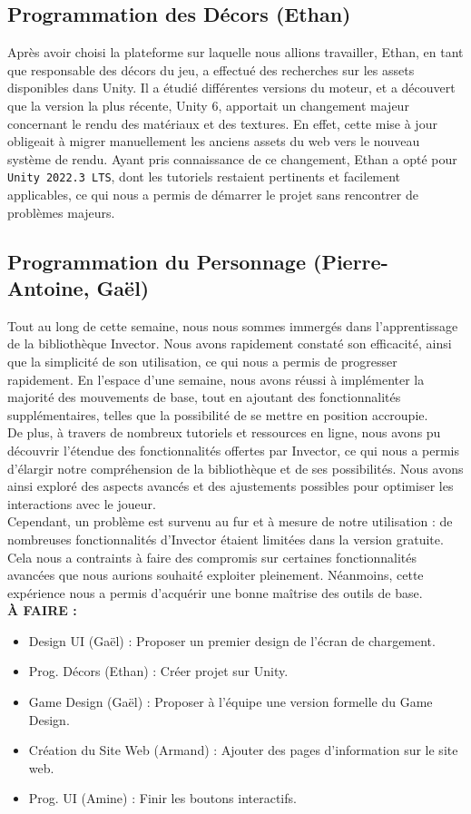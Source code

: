 \documentclass{report}
\begin{document}
\subsection*{Programmation des Décors (Ethan)}
Après avoir choisi la plateforme sur laquelle nous allions travailler, Ethan, en tant que responsable des décors du jeu, a effectué des recherches sur les assets disponibles dans Unity. Il a étudié différentes versions du moteur, et a découvert que la version la plus récente, Unity 6, apportait un changement majeur concernant le rendu des matériaux et des textures. En effet, cette mise à jour obligeait à migrer manuellement les anciens assets du web vers le nouveau système de rendu. Ayant pris connaissance de ce changement, Ethan a opté pour \texttt{Unity 2022.3 LTS}, dont les tutoriels restaient pertinents et facilement applicables, ce qui nous a permis de démarrer le projet sans rencontrer de problèmes majeurs.

\subsection*{Programmation du Personnage (Pierre-Antoine, Gaël)}
Tout au long de cette semaine, nous nous sommes immergés dans l’apprentissage de la bibliothèque Invector. Nous avons rapidement constaté son efficacité, ainsi que la simplicité de son utilisation, ce qui nous a permis de progresser rapidement. En l’espace d’une semaine, nous avons réussi à implémenter la majorité des mouvements de base, tout en ajoutant des fonctionnalités supplémentaires, telles que la possibilité de se mettre en position accroupie.
\\[0.4cm]
De plus, à travers de nombreux tutoriels et ressources en ligne, nous avons pu découvrir l’étendue des fonctionnalités offertes par Invector, ce qui nous a permis d’élargir notre compréhension de la bibliothèque et de ses possibilités. Nous avons ainsi exploré des aspects avancés et des ajustements possibles pour optimiser les interactions avec le joueur.
\\[0.4cm]
Cependant, un problème est survenu au fur et à mesure de notre utilisation : de nombreuses fonctionnalités d’Invector étaient limitées dans la version gratuite. Cela nous a contraints à faire des compromis sur certaines fonctionnalités avancées que nous aurions souhaité exploiter pleinement. Néanmoins, cette expérience nous a permis d’acquérir une bonne maîtrise des outils de base.
\\[1cm]
\textbf{À FAIRE :}
\begin{itemize}
    \item Design UI (Gaël) : Proposer un premier design de l'écran de chargement.
    \item Prog. Décors (Ethan) : Créer projet sur Unity.
    \item Game Design (Gaël) : Proposer à l'équipe une version formelle du Game Design.
    \item Création du Site Web (Armand) : Ajouter des pages d'information sur le site web.
    \item Prog. UI (Amine) : Finir les boutons interactifs.
\end{itemize}
\end{document}
